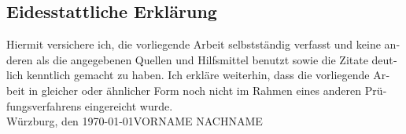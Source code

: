 \newpage
\begin{otherlanguage}{ngerman}
\thispagestyle{empty}
\section*{Eidesstattliche Erklärung}
\thispagestyle{empty}
Hiermit versichere ich, die vorliegende Arbeit selbstständig verfasst und keine anderen als die angegebenen Quellen und Hilfsmittel benutzt sowie die Zitate deutlich kenntlich gemacht zu haben.
\newline
Ich erkläre weiterhin, dass die vorliegende Arbeit in gleicher oder ähnlicher Form noch nicht im Rahmen eines
anderen Prüfungsverfahrens eingereicht wurde.
\vspace{4\baselineskip}\\
Würzburg, den \today \hfill VORNAME NACHNAME 
\vspace{4\baselineskip}\\
\end{otherlanguage}